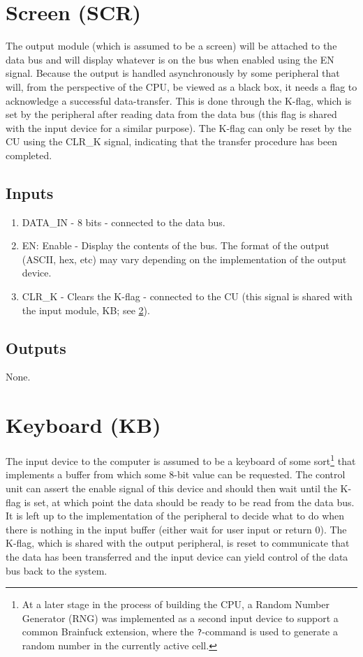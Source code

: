 \section{Screen (SCR)}  \label{sec:architecture:scr}
The output module (which is assumed to be a screen) will be attached to the data bus and will display whatever is on the bus when enabled using the EN signal. Because the output is handled asynchronously by some peripheral that will, from the perspective of the CPU, be viewed as a black box, it needs a flag to acknowledge a successful data-transfer. This is done through the K-flag, which is set by the peripheral after reading data from the data bus (this flag is shared with the input device for a similar purpose). The K-flag can only be reset by the CU using the CLR\_K signal, indicating that the transfer procedure has been completed.
\subsection*{Inputs}
\begin{enumerate}
\itemsep0em 
\item DATA\_IN - 8 bits - connected to the data bus.
\item EN: Enable - Display the contents of the bus. The format of the output (ASCII, hex, etc) may vary depending on the implementation of the output device.
\item CLR\_K - Clears the K-flag - connected to the CU (this signal is shared with the input module, KB; see \ref{sec:architecture:kb}).
\end{enumerate}

\subsection*{Outputs}
None.

\section{Keyboard (KB)} \label{sec:architecture:kb}
The input device to the computer is assumed to be a keyboard of some sort\footnote{At a later stage in the process of building the CPU, a Random Number Generator (RNG) was implemented as a second input device to support a common Brainfuck extension, where the \texttt{?}-command is used to generate a random number in the currently active cell.} that implements a buffer from which some 8-bit value can be requested. The control unit can assert the enable signal of this device and should then wait until the K-flag is set, at which point the data should be ready to be read from the data bus. It is left up to the implementation of the peripheral to decide what to do when there is nothing in the input buffer (either wait for user input or return 0). The K-flag, which is shared with the output peripheral, is reset to communicate that the data has been transferred and the input device can yield control of the data bus back to the system.


